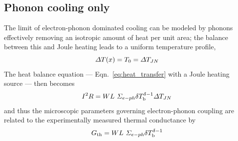 \subsection{Phonon cooling only}
The limit of electron-phonon dominated cooling can be modeled by phonons effectively removing an isotropic amount of heat per unit area; the balance between this and Joule heating leads to a uniform temperature profile, 
\begin{equation}
\Delta T(x) = T_0 = \Delta T_{JN}
\end{equation}
The heat balance equation --- Eqn.~\ref{eq:heat_transfer} with a Joule heating source --- then becomes
\begin{equation}
I^2R = WL~\Sigma_{e-ph}\delta T_\mathrm{b}^{\delta-1}\Delta T_{JN}
\end{equation}
and thus the microscopic parameters governing electron-phonon coupling are related to the experimentally measured thermal conductance by
\begin{equation}
G_{\mathrm{th}} = WL~\Sigma_{e-ph}\delta T_\mathrm{b}^{\delta-1}
\end{equation}

